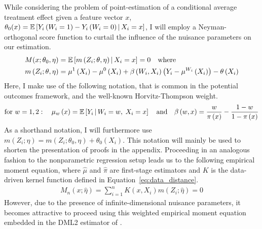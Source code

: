 While considering the problem of point-estimation of a conditional average
treatment effect given a feature vector $x$,
$\theta_{0}(x) = \mathbb{E}\left[Y_{i}\left(W_{i} = 1\right) -
		Y_{i}\left(W_{i} = 0\right) \, \middle| \, X_{i} = x\right]$, I
will employ a Neyman-orthogonal score function to curtail the influence of the
nuisance parameters on our estimation.
\begin{equation}
	\begin{aligned}
		M(x; \theta_{0}, \eta)
		 & = \mathbb{E}\left[m\left(Z_{i}; \theta, \eta\right) \, \middle| \, X_{i} = x\right]
		= 0
		\quad \text{where} \quad                                                                                                                                                                                       \\
		m\left(Z_{i}; \theta, \eta\right)
		 & = \mu^{1}\left(X_{i}\right) - \mu^{0}\left(X_{i}\right) + \beta\left(W_{i}, X_{i}\right)\left(Y_{i} - \mu^{W_{i}}\left(X_{i}\right)\right) - \theta\left(X_{i}\right)
	\end{aligned}
\end{equation}
Here, I make use of the following notation, that is common in the potential
outcomes framework, and the well-known Horvitz-Thompson weight.
\begin{equation}
	\text{for }  w = 1,2: \quad \mu_w\left(x\right) = \mathbb{E}\left[Y_{i} \, \middle| \, W_{i} = w, \; X_{i} = x\right]
	\quad \text{and} \quad
	\beta\left(w, x\right) = \frac{w}{\pi\left(x\right)} - \frac{1 - w}{1 - \pi\left(x\right)}
\end{equation}
As a shorthand notation, I will furthermore use $m\left(Z_{i}; \eta\right) = m\left(Z_{i}; \theta_{0}, \eta\right) + \theta_{0}\left(X_{i}\right)$.
This notation will mainly be used to shorten the presentation of proofs in the appendix.
Proceeding in an analogous fashion to the nonparametric regression setup leads us to the following empirical moment equation, where $\hat{\mu}$ and $\hat{\pi}$ are first-stage estimators and $K$ is the data-driven kernel function defined in Equation~\ref{eq:data_distance}.
\begin{equation}
	\begin{aligned}
		M_{n}\left(x; \hat{\eta}\right)
		= \sum_{i = 1}^{n} K(x, X_{i}) m\left(Z_{i}; \hat{\eta}\right)
		= 0
	\end{aligned}
\end{equation}
However, due to the presence of infinite-dimensional nuisance parameters, it becomes attractive to proceed using this weighted empirical moment equation embedded in the DML2 estimator of \citet{chernozhukov_doubledebiased_2018}.

